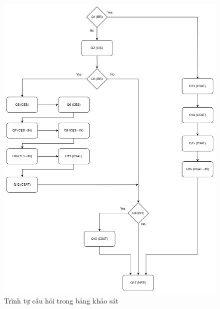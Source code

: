     \begin{figure}[H]
        \centering
        \includegraphics[width = \linewidth]{Content/Cơ sở lý thuyết/documents/Survey/images/surveyflow.png}
        \vspace{0.5cm}
        \caption{Trình tự câu hỏi trong bảng khảo sát}
        \label{fig:Trình tự câu hỏi trong bảng khảo sát}
    \end{figure}